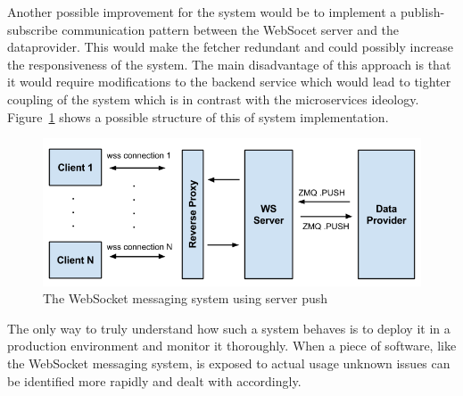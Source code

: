 \newpage
\noindent
Another possible improvement for the system would be to implement a publish-subscribe communication pattern between the WebSocet server and the dataprovider. This would make the fetcher redundant and could possibly increase the responsiveness of the system. The main disadvantage of this approach is that it would require modifications to the backend service which would lead to tighter coupling of the system which is in contrast with the microservices ideology. Figure~\ref{fig:websocketMessagingSystemServerPush} shows a possible structure of this of system implementation.
\\
\begin{figure}[h!]
	\centering
	\includegraphics[width=1\textwidth]{images/websocketMessagingSystemServerPush}
	\caption{The WebSocket messaging system using server push}
	\label{fig:websocketMessagingSystemServerPush}
\end{figure}

\noindent
The only way to truly understand how such a system behaves is to deploy it in a production environment and monitor it thoroughly. When a piece of software, like the WebSocket messaging system, is exposed to actual usage unknown issues can be identified more rapidly and dealt with accordingly.

